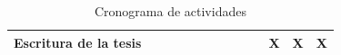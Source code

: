 \begin{table}[H]
{\begin{tabular}{|l|llllllllllll|}
    Escritura de la tesis                                                     & \multicolumn{1}{l|}{}                          & \multicolumn{1}{l|}{}                          & \multicolumn{1}{l|}{}                          & \multicolumn{1}{l|}{}                          & \multicolumn{1}{l|}{}                          & \multicolumn{1}{l|}{}                          & \multicolumn{1}{l|}{}                          & \multicolumn{1}{l|}{}                          & \multicolumn{1}{l|}{}                          & \multicolumn{1}{l|}{X}                          & \multicolumn{1}{l|}{X}                          & X                                               \\ \hline
    \end{tabular}%
    }
    \caption{Cronograma de actividades}
    \label{tab:cronograma}
\end{table}
